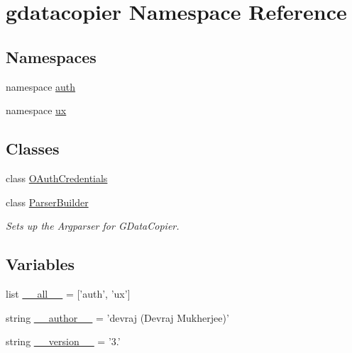 \hypertarget{namespacegdatacopier}{\section{gdatacopier \-Namespace \-Reference}
\label{namespacegdatacopier}
}
\subsection*{\-Namespaces}
\begin{DoxyCompactItemize}
\item 
namespace \hyperlink{namespacegdatacopier_1_1auth}{auth}
\item 
namespace \hyperlink{namespacegdatacopier_1_1ux}{ux}
\end{DoxyCompactItemize}
\subsection*{\-Classes}
\begin{DoxyCompactItemize}
\item 
class \hyperlink{classgdatacopier_1_1_o_auth_credentials}{\-O\-Auth\-Credentials}
\item 
class \hyperlink{classgdatacopier_1_1_parser_builder}{\-Parser\-Builder}
\begin{DoxyCompactList}\small\item\em \-Sets up the \-Argparser for \-G\-Data\-Copier. \end{DoxyCompactList}\end{DoxyCompactItemize}
\subsection*{\-Variables}
\begin{DoxyCompactItemize}
\item 
list \hyperlink{namespacegdatacopier_adc7a412325fefd36f91164fc74204536}{\-\_\-\-\_\-all\-\_\-\-\_\-} = \mbox{[}'auth', 'ux'\mbox{]}
\item 
string \hyperlink{namespacegdatacopier_a04afb4dbe5ef068f0e1098b8ca4cbbc7}{\-\_\-\-\_\-author\-\_\-\-\_\-} = 'devraj (\-Devraj \-Mukherjee)'
\item 
string \hyperlink{namespacegdatacopier_ad865e398b52c0688549ea241ebb13de1}{\-\_\-\-\_\-version\-\_\-\-\_\-} = '3.'
\end{DoxyCompactItemize}


